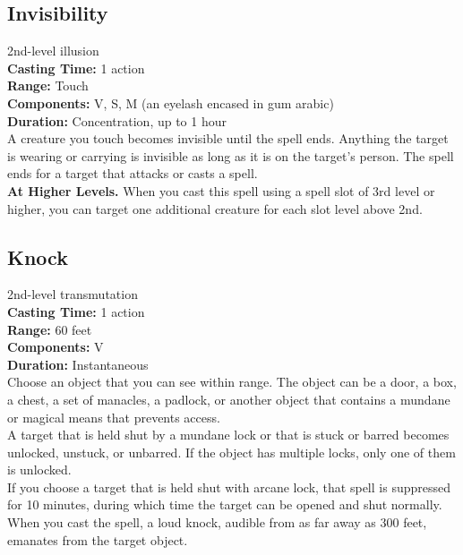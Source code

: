\documentclass[11pt, A4paper, english]{article}
\begin{document}
		\subsection{Invisibility}
2nd-level illusion \\
\textbf{Casting Time:} 1 action \\
\textbf{Range:} Touch \\
\textbf{Components:} V, S, M (an eyelash encased in gum arabic) \\
\textbf{Duration:} Concentration, up to 1 hour \\
A creature you touch becomes invisible until the spell ends. Anything the target is wearing or carrying is invisible as long as it is on the target’s person. The spell ends for a target that attacks or casts a spell. \\
\textbf{At Higher Levels.} When you cast this spell using a spell slot of 3rd level or higher, you can target one additional creature for each slot level above 2nd.

		\subsection{Knock}
2nd-level transmutation \\
\textbf{Casting Time:} 1 action \\
\textbf{Range:} 60 feet \\
\textbf{Components:} V \\
\textbf{Duration:} Instantaneous \\
Choose an object that you can see within range. The object can be a door, a box, a chest, a set of manacles, a padlock, or another object that contains a mundane or magical means that prevents access. \\
A target that is held shut by a mundane lock or that is stuck or barred becomes unlocked, unstuck, or unbarred. If the object has multiple locks, only one of them is unlocked. \\
If you choose a target that is held shut with arcane lock, that spell is suppressed for 10 minutes, during which time the target can be opened and shut normally. When you cast the spell, a loud knock, audible from as far away as 300 feet, emanates from the target object.
\end{document}
